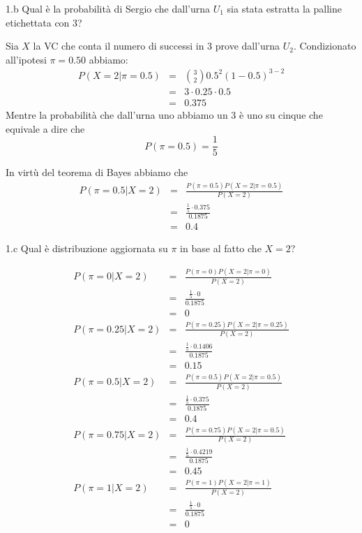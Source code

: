 \documentclass[
  11pt,
]{book}
\theoremstyle{mytheoremstyle}
\theoremstyle{mydefstyle}
\newenvironment{sol}
  {
  \begin{tcolorbox}[enhanced,breakable,arc=0.1mm,boxrule=1pt,colback=white,colframe=iblue,
  title=\bf \fontfamily{lmss}\selectfont \hspace{.5 cm} Soluzione,drop fuzzy shadow]

}{
\end{tcolorbox}
  }
\begin{document}
1.b Qual è la probabilità di Sergio che dall'urna \(U_1\) sia stata estratta la palline etichettata con 3?

\begin{sol}
Sia \(X\) la VC che conta il numero di successi in 3 prove dall'urna \(U_2\).
Condizionato all'ipotesi \(\pi=0.50\) abbiamo:
\begin{eqnarray*}
  P(X=2|\pi=0.5) &=&  \binom{3}{2}0.5^2(1-0.5)^{3-2}\\
                 &=&  3\cdot 0.25\cdot 0.5\\
                 &=&  0.375
\end{eqnarray*}
Mentre la probabilità che dall'urna uno abbiamo un 3 è uno su cinque che equivale a dire che
\[
P(\pi=0.5)=\frac 15
\]

In virtù del teorema di Bayes abbiamo che
\begin{eqnarray*}
P(\pi=0.5|X=2)   &=&  \frac{P(\pi=0.5)P(X=2|\pi=0.5)}{P(X=2)}\\
                 &=&  \frac{\frac 15 \cdot 0.375}{0.1875}\\
                 &=& 0.4
\end{eqnarray*}

\end{sol}

1.c Qual è distribuzione aggiornata su \(\pi\) in base al fatto che \(X=2\)?

\begin{sol}
\begin{eqnarray*}
P(\pi=0|X=2)   &=&  \frac{P(\pi=0)P(X=2|\pi=0)}{P(X=2)}\\
                 &=&  \frac{\frac 15 \cdot 0}{0.1875}\\
                 &=& 0\\
P(\pi=0.25|X=2)   &=&  \frac{P(\pi=0.25)P(X=2|\pi=0.25)}{P(X=2)}\\
                 &=&  \frac{\frac 15 \cdot 0.1406}{0.1875}\\
                 &=& 0.15\\
P(\pi=0.5|X=2)   &=&  \frac{P(\pi=0.5)P(X=2|\pi=0.5)}{P(X=2)}\\
                 &=&  \frac{\frac 15 \cdot 0.375}{0.1875}\\
                 &=& 0.4\\
P(\pi=0.75|X=2)   &=&  \frac{P(\pi=0.75)P(X=2|\pi=0.5)}{P(X=2)}\\
                 &=&  \frac{\frac 15 \cdot 0.4219}{0.1875}\\
                 &=& 0.45\\
P(\pi=1|X=2)   &=&  \frac{P(\pi=1)P(X=2|\pi=1)}{P(X=2)}\\
                 &=&  \frac{\frac 15 \cdot 0}{0.1875}\\
                 &=& 0
\end{eqnarray*}

\end{sol}
\end{document}
